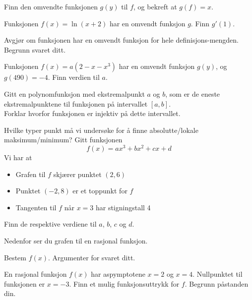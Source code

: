 Finn den omvendte funksjonen $ g(y) $ til $ f $, og bekreft at $ g(f)=x $. \os
{}

Funksjonen $f(x)=\ln(x+2)$ har en omvendt funksjon $g$. Finn $g'(1)$.


Avgjør om funksjonen har en omvendt funksjon for hele definisjons-mengden. Begrunn svaret ditt.

Funksjonen $ f(x)=a(2-x-x^3) $ har en omvendt funksjon $ g(y) $, og $ g(490)= -4$. Finn verdien til $ a $.

Gitt en polynomfunksjon med ekstremalpunkt $ a $ og $ b $, som er de eneste ekstremalpunktene til funksjonen på intervallet $ [a, b] $. \\ Forklar hvorfor funksjonen er injektiv på dette intervallet.


Hvilke typer punkt må vi undersøke for å finne absolutte/lokale maksimum/minimum?
\newpage
{}
Gitt funksjonen
\[ f(x)=ax^3+bx^2+cx+d \]
Vi har at
\begin{itemize}
	\item Grafen til $f$ skjærer punktet $(2, 6)$
	\item Punktet $(-2, 8) $ er et toppunkt for $f$
	\item Tangenten til $f$ når $x=3$ har stigningstall 4
\end{itemize}
Finn de respektive verdiene til $a$, $b$, $c$ og $d$.

Nedenfor ser du grafen til en rasjonal funksjon.\os

Bestem $ f(x) $. Argumenter for svaret ditt.

En rasjonal funksjon $f(x)$ har aspymptotene $x=2$ og $x=4$. Nullpunktet til funksjonen er $x=-3$. Finn et mulig funksjonsuttrykk for $f$. Begrunn påstanden din.

\newpage
{}

